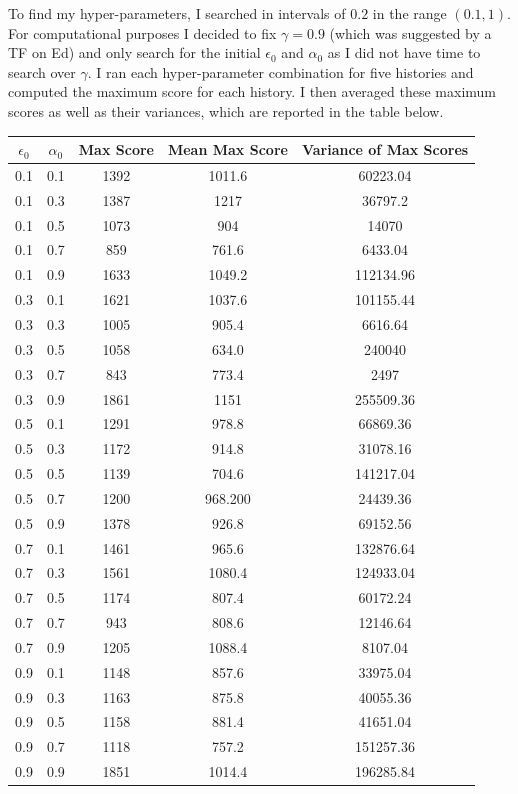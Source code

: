 \documentclass[submit]{harvardml}
\begin{document}
To find my hyper-parameters, I searched in intervals of $0.2$ in the range $(0.1, 1)$. For computational purposes I decided to fix $\gamma = 0.9$ (which was suggested by a TF on Ed) and only search for the initial $\epsilon_0$ and $\alpha_0$ as I did not have time to search over $\gamma$. I ran each hyper-parameter combination for five histories and computed the maximum score for each history. I then averaged these maximum scores as well as their variances, which are reported in the table below. 
\begin{center}
\begin{tabular}{||c c c c c||} 
 \hline
 $\epsilon_0$ & $\alpha_0$ & Max Score & Mean Max Score & Variance of Max Scores\\ [0.5ex] 
 \hline\hline
 0.1 & 0.1 & 1392 & 1011.6 & 60223.04 \\ 
 \hline
 0.1 & 0.3 & 1387 & 1217 & 36797.2 \\
 \hline
 0.1 & 0.5 & 1073 & 904 & 14070 \\
 \hline
 0.1 & 0.7 & 859 & 761.6 & 6433.04 \\
 \hline
 0.1 & 0.9 & 1633 & 1049.2 & 112134.96 \\
 \hline
 0.3 & 0.1 & 1621 & 1037.6 & 101155.44 \\ 
 \hline
 0.3 & 0.3 & 1005 & 905.4 & 6616.64 \\
 \hline
 0.3 & 0.5 & 1058 & 634.0 & 240040 \\
 \hline
 0.3 & 0.7 & 843 & 773.4 & 2497 \\
 \hline
 0.3 & 0.9 & 1861 & 1151 & 255509.36 \\
 \hline
 0.5 & 0.1 & 1291 & 978.8 & 66869.36 \\ 
 \hline
 0.5 & 0.3 & 1172 & 914.8 & 31078.16 \\
 \hline
 0.5 & 0.5 & 1139 & 704.6 & 141217.04 \\
 \hline
 0.5 & 0.7 & 1200 & 968.200 & 24439.36 \\
 \hline
 0.5 & 0.9 & 1378 & 926.8 & 69152.56 \\
 \hline
 0.7 & 0.1 & 1461 & 965.6 & 132876.64 \\ 
 \hline
 0.7 & 0.3 & 1561 & 1080.4 & 124933.04 \\
 \hline
 0.7 & 0.5 & 1174 & 807.4 & 60172.24 \\
 \hline
 0.7 & 0.7 & 943 & 808.6 & 12146.64 \\
 \hline
 0.7 & 0.9 & 1205 & 1088.4 & 8107.04 \\
 \hline
 0.9 & 0.1 & 1148 & 857.6 & 33975.04 \\ 
 \hline
 0.9 & 0.3 & 1163 & 875.8 & 40055.36 \\
 \hline
 0.9 & 0.5 &  1158 & 881.4 & 41651.04 \\
 \hline
 0.9 & 0.7 & 1118 & 757.2 & 151257.36 \\
 \hline
 0.9 & 0.9 & 1851 & 1014.4 & 196285.84 \\
 \hline
\end{tabular}
\end{center}
\end{document}
